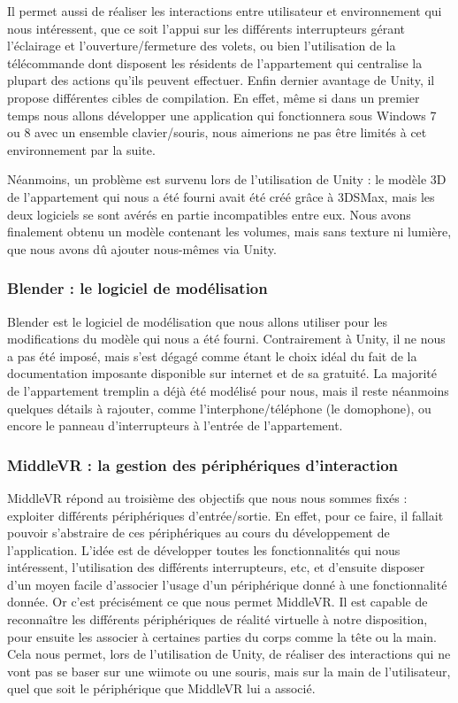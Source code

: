 Il permet aussi de réaliser les interactions entre utilisateur et environnement qui nous intéressent, que ce soit l'appui sur les différents interrupteurs gérant l'éclairage et l'ouverture/fermeture des volets, ou bien l'utilisation de la télécommande dont disposent les résidents de l'appartement qui centralise la plupart des actions qu'ils peuvent effectuer.
Enfin dernier avantage de Unity, il propose différentes cibles de compilation. En effet, même si dans un premier temps nous allons développer une application qui fonctionnera sous Windows 7 ou 8 avec un ensemble clavier/souris, nous aimerions ne pas être limités à cet environnement par la suite. \newline

Néanmoins, un problème est survenu lors de l'utilisation de Unity : le modèle 3D de l'appartement qui nous a été fourni avait été créé grâce à 3DSMax, mais les deux logiciels se sont avérés en partie incompatibles entre eux. Nous avons finalement obtenu un modèle contenant les volumes, mais sans texture ni lumière, que nous avons dû ajouter nous-mêmes via Unity. 

\subsubsection{Blender : le logiciel de modélisation}
Blender est le logiciel de modélisation que nous allons utiliser pour les modifications du modèle qui nous a été fourni. Contrairement à Unity, il ne nous a pas été imposé, mais s'est dégagé comme étant le choix idéal du fait de la documentation imposante disponible sur internet et de sa gratuité.\newline
La majorité de l'appartement tremplin a déjà été modélisé pour nous, mais il reste néanmoins quelques détails à rajouter, comme l'interphone/téléphone (le domophone), ou encore le panneau d'interrupteurs à l'entrée de l'appartement. 

\subsubsection{MiddleVR : la gestion des périphériques d'interaction}

MiddleVR répond au troisième des objectifs que nous nous sommes fixés : exploiter différents périphériques d'entrée/sortie. En effet, pour ce faire, il fallait pouvoir s'abstraire de ces périphériques au cours du développement de l'application. L'idée est de développer toutes les fonctionnalités qui nous intéressent, l'utilisation des différents interrupteurs, etc, et d'ensuite disposer d'un moyen facile d'associer l'usage d'un périphérique donné à une fonctionnalité donnée.\newline
Or c'est précisément ce que nous permet MiddleVR. Il est capable de reconnaître les différents périphériques de réalité virtuelle à notre disposition, pour ensuite les associer à certaines parties du corps comme la tête ou la main. Cela nous permet, lors de l'utilisation de Unity, de réaliser des interactions qui ne vont pas se  baser sur une wiimote ou une souris, mais sur la main de l'utilisateur, quel que soit le périphérique que MiddleVR lui a associé. 

